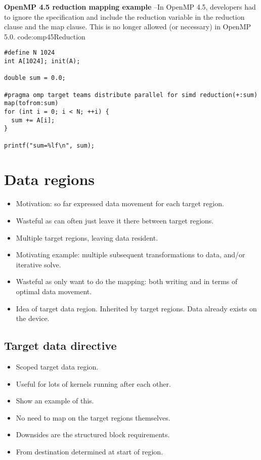 \begin{CodeExample}%
{\textbf{OpenMP 4.5 reduction mapping example} --\small In OpenMP 4.5, developers had to ignore the specification and include
the reduction variable in the reduction clause and the map clause. This is no longer allowed (or necessary) in OpenMP 5.0.
}%
{code:omp45Reduction}
\begin{lstlisting}
#define N 1024
int A[1024]; init(A);

double sum = 0.0;

#pragma omp target teams distribute parallel for simd reduction(+:sum) map(tofrom:sum)
for (int i = 0; i < N; ++i) {
  sum += A[i];
}

printf("sum=%lf\n", sum);
\end{lstlisting}
\end{CodeExample}


\section{Data regions}
\begin{itemize}
  \item Motivation: so far expressed data movement for each target region.
  \item Wasteful as can often just leave it there between target regions.
  \item Multiple target regions, leaving data resident.
  \item Motivating example: multiple subsequent transformations to data, and/or iterative solve.
  \item Wasteful as only want to do the mapping: both writing and in terms of optimal data movement.
  \item Idea of target data region. Inherited by target regions. Data already exists on the device.
\end{itemize}

\subsection{Target data directive}
\label{ssec:target_data}
\begin{itemize}
  \item Scoped target data region.
  \item Useful for lots of kernels running after each other.
  \item Show an example of this.
  \item No need to map on the target regions themselves.
  \item Downsides are the structured block requirements.
  \item From destination determined at start of region.
\end{itemize}

